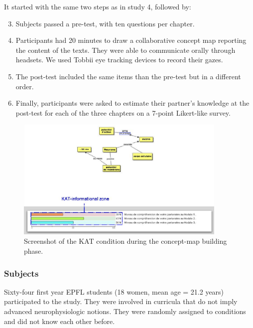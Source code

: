 \documentclass[twocolumn]{article}
\begin{document}
It started with the same two steps as in study 4, followed by:

\begin{enumerate}
    \setcounter{enumi}{2}

    \item Subjects passed a pre-test, with ten questions per chapter. 

    \item Participants had 20 minutes to draw a collaborative concept map
        reporting the content of the texts. They were able to communicate
        orally through headsets.  We used Tobbii eye tracking devices to
        record their gazes.

    \item The post-test included the same items than the pre-test but in a
        different order. 

    \item  Finally, participants were asked to estimate their partner's
        knowledge at the post-test for each of the three chapters on a 7-point
        Likert-like survey. 

\end{enumerate}

\begin{figure}
        \centering
        \includegraphics[width=0.9\textwidth]{image11.png}
        \caption{Screenshot of the KAT condition during the concept-map building
        phase.}
        \label{study5:kat}
\end{figure}

\subsubsection*{Subjects}

Sixty-four first year EPFL students (18 women, mean age = 21.2 years)
participated to the study. They were involved in curricula that do not imply
advanced neurophysiologic notions. They were randomly assigned to conditions and
did not know each other before. 
\end{document}
